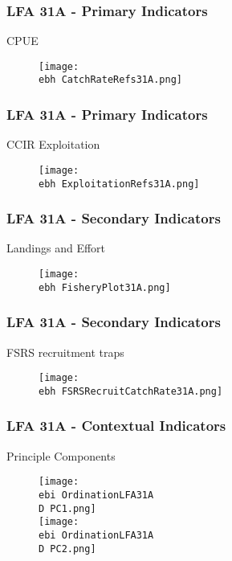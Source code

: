 \documentclass{beamer}
\newcommand{\ebh}{\string~/bio.data/bio.lobster/figures/Assessment/LFA2732/} %
\newcommand{\ebi}{\string~/bio.data/bio.lobster/figures/Assessment/Indicators/} %
\newcommand{\D}{.}
\begin{document}
\begin{frame}
\frametitle{LFA 31A - Primary Indicators}
CPUE
\begin{figure}
        \begin{center}
            \texttt{[image: \\ebh CatchRateRefs31A.png]}
        \end{center}
    \end{figure}
\end{frame}



\begin{frame}
\frametitle{LFA 31A - Primary Indicators}
CCIR Exploitation 
\begin{figure}
        \begin{center}
            \texttt{[image: \\ebh ExploitationRefs31A.png]}
        \end{center}
    \end{figure}
\end{frame}




\begin{frame}
\frametitle{LFA 31A - Secondary Indicators}
Landings and Effort
\begin{figure}
        \begin{center}
            \texttt{[image: \\ebh FisheryPlot31A.png]}
        \end{center}
    \end{figure}
\end{frame}



\begin{frame}
\frametitle{LFA 31A - Secondary Indicators}
FSRS recruitment traps
\begin{figure}
        \begin{center}
            \texttt{[image: \\ebh FSRSRecruitCatchRate31A.png]}
        \end{center}
    \end{figure}
\end{frame}



\begin{frame}
\frametitle{LFA 31A - Contextual Indicators}
Principle Components
\begin{figure}
        \begin{center}
            \texttt{[image: \\ebi OrdinationLFA31A\\D PC1.png]}\\
            \texttt{[image: \\ebi OrdinationLFA31A\\D PC2.png]}
        \end{center}
    \end{figure}
\end{frame}
\end{document}
